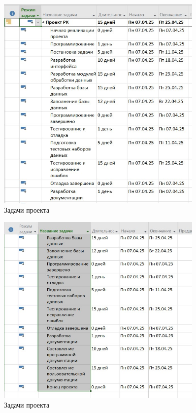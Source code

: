 \begin{figure}[H]
	\centering
	\includegraphics[width=0.9\textwidth]{img/task2/screen2_1.jpg}
	\caption{Задачи проекта}
	\label{fig:task2}
\end{figure}

\begin{figure}[H]
	\centering
	\includegraphics[width=0.9\textwidth]{img/task2/screen2_2.jpg}
	\caption{Задачи проекта}
	\label{fig:task2_1}
\end{figure}

